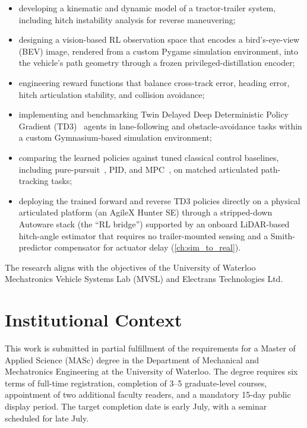 \begin{itemize}
    \item developing a kinematic and dynamic model of a tractor-trailer system, including hitch instability analysis for reverse maneuvering;
    \item designing a vision-based RL observation space that encodes a bird's-eye-view (BEV) image, rendered from a custom Pygame simulation environment, into the vehicle's path geometry through a frozen privileged-distillation encoder;
    \item engineering reward functions that balance cross-track error, heading error, hitch articulation stability, and collision avoidance;
    \item implementing and benchmarking Twin Delayed Deep Deterministic Policy Gradient (TD3)~\cite{fujimoto2018td3} agents in lane-following and obstacle-avoidance tasks within a custom Gymnasium-based simulation environment;
    \item comparing the learned policies against tuned classical control baselines, including pure-pursuit~\cite{coulter1992pure}, PID, and MPC~\cite{rawlings2017mpc}, on matched articulated path-tracking tasks;
    \item deploying the trained forward and reverse TD3 policies directly on a physical articulated platform (an AgileX Hunter SE) through a stripped-down Autoware stack (the ``RL bridge'') supported by an onboard LiDAR-based hitch-angle estimator that requires no trailer-mounted sensing and a Smith-predictor compensator for actuator delay (\cref{ch:sim_to_real}).
\end{itemize}

The research aligns with the objectives of the University of Waterloo Mechatronics Vehicle Systems Lab (MVSL) and Electrans Technologies Ltd.

\section{Institutional Context}

This work is submitted in partial fulfillment of the requirements for a Master of Applied Science (MASc) degree in the Department of Mechanical and Mechatronics Engineering at the University of Waterloo. The degree requires six terms of full-time registration, completion of 3--5 graduate-level courses, appointment of two additional faculty readers, and a mandatory 15-day public display period. The target completion date is early July, with a seminar scheduled for late July.

